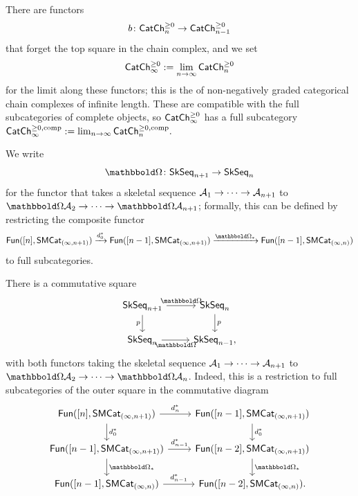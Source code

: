 \documentclass[a4paper,11pt]{article}
\begin{document}
\begin{defn}
  There are functors
  \[ b \colon \CChp_{n} \to \CChp_{n-1}\]
  that forget the top square in the chain complex, and we set
  \[ \textup{\textsf{CatCh}}^{\geq 0}_{\infty} := \operatorname*{lim}_{n \rightarrow \infty} \textup{\textsf{CatCh}}^{\geq 0}_{n}\] for
  the limit along these functors; this is the \icat{} of
  non-negatively graded categorical chain complexes of infinite
  length. These are compatible with the full subcategories of complete
  objects, so $\textup{\textsf{CatCh}}^{\geq 0}_{\infty}$ has a full subcategory
  $\textup{\textsf{CatCh}}^{\geq 0,\text{\textup{comp}}}_{\infty} := \operatorname*{lim}_{n \rightarrow \infty} \textup{\textsf{CatCh}}^{\geq 0,\text{\textup{comp}}}_{n}.$
\end{defn}

\begin{defn}
  We write \[\mOm \colon \SkSeq_{n+1} \to \SkSeq_{n}\] for the functor
  that takes a skeletal sequence $\nA_{1} \to \cdots \to \nA_{n+1}$ to
  $\mOm \nA_{2} \to \cdots \to \mOm \nA_{n+1}$; formally, this can be defined by
  restricting the composite functor
  \[ \Fun([n], \SMCat_{(\infty,n+1)}) \xto{d_{0}^{*}} \Fun([n-1],
    \SMCat_{(\infty,n+1)}) \xto{\mOm_{*}} \Fun([n-1], \SMCatIn)\]
  to full subcategories.
\end{defn}

\begin{observation}\label{obs:Omega bottom commute} 
  There is a commutative square
  \[
    \begin{tikzcd}
     \SkSeq_{n+1} \ar[r, "\mOm"] \ar[d, "p"'] & \SkSeq_{n}  \ar[d, "p"] \\
     \SkSeq_{n} \ar[r, "\mOm"'] & \SkSeq_{n-1},
    \end{tikzcd}
  \]
  with both functors taking the skeletal sequence $\nA_{1} \to \cdots
  \to \nA_{n+1}$ to $\mOm \nA_{2} \to \cdots \to \mOm
  \nA_{n}$. Indeed, this is a restriction to full subcategories of
  the outer square in the commutative diagram
  \begin{equation}
    \label{eq:Omega bottom commute diagram}
    \begin{tikzcd}
      \Fun([n], \SMCat_{(\infty,n+1)}) \ar[d, "d_{0}^{*}"] \ar[r, "d_{n}^{*}"] & 
      \Fun([n-1],\SMCat_{(\infty,n+1)}) \ar[d, "d_{0}^{*}"]
      \\
\Fun([n-1], \SMCat_{(\infty,n+1)})  \ar[r, "d_{n-1}^{*}"] \ar[d,
      "\mOm_{*}"] &
            \Fun([n-2], \SMCat_{(\infty,n+1)}) \ar[d,
      "\mOm_{*}"]
      \\
      \Fun([n-1], \SMCatIn) \ar[r, "d_{n-1}^{*}"] 
 & \Fun([n-2], \SMCatIn).
    \end{tikzcd}
  \end{equation}\end{observation}
\end{document}
